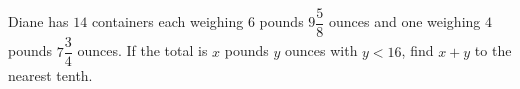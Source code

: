 Diane has $14$ containers each weighing $6$ pounds $9\dfrac58$ ounces and one weighing $4$ pounds $7\dfrac34$ ounces. If the total is $x$ pounds $y$ ounces with $y<16$, find $x+y$ to the nearest tenth.
